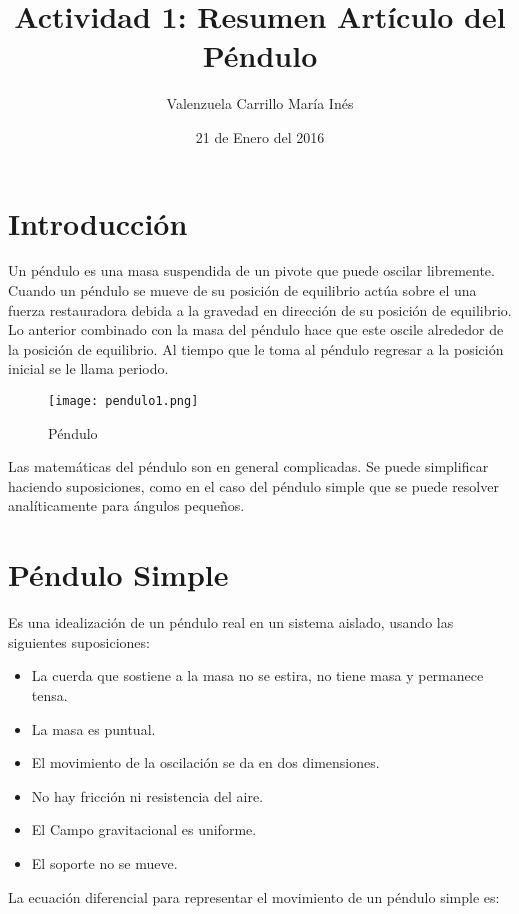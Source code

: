 \documentclass[12pt]{article}
\begin{document}
\title{Actividad 1: Resumen Artículo del Péndulo}
\author{Valenzuela Carrillo María Inés }
\date{21 de Enero del 2016}
\maketitle

\pagebreak

\section{Introducción}
Un péndulo es una masa suspendida de un pivote que puede oscilar libremente. Cuando un péndulo se mueve de su posición de equilibrio actúa sobre el una fuerza restauradora debida a la gravedad en dirección de su posición de equilibrio. Lo anterior combinado con la masa del péndulo hace que este oscile alrededor de la posición de equilibrio. Al tiempo que le toma al péndulo regresar a la posición inicial se le llama periodo.

\begin{figure}[H]
\centering		 			
\texttt{[image: pendulo1.png]}
\caption{Péndulo}
\end{figure} 

Las matemáticas del péndulo son en general complicadas. Se puede simplificar haciendo suposiciones, como en el caso del péndulo simple que se puede resolver analíticamente para ángulos pequeños.

\section{Péndulo Simple}

Es una idealización de un péndulo real en un sistema aislado, usando las siguientes suposiciones:

\begin{itemize}
\item La cuerda que sostiene a la masa no se estira, no tiene masa y permanece tensa.
\item La masa es puntual.
\item El movimiento de la oscilación se da en dos dimensiones.
\item No hay fricción ni resistencia del aire.
\item El Campo gravitacional es uniforme.
\item El soporte no se mueve.
\end{itemize}

La ecuación diferencial para representar el movimiento de un péndulo simple es:
\end{document}
